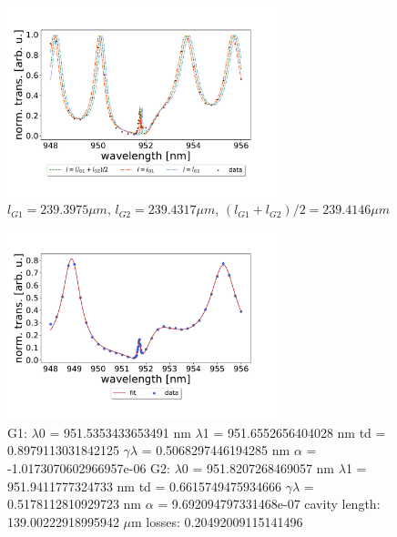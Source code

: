 \begin{figure}[h!]
    \centering
    \includegraphics[width=0.7\textwidth]{figures/results/238um_long_scan_sim_comparison.pdf}
    \caption{$l_{G1} = 239.3975 \mu m$, $l_{G2} = 239.4317 \mu m$, $(l_{G1} + l_{G2})/2 = 239.4146 \mu m$}
    \label{fig:238um_long_scan_sim_comparison}
\end{figure}

\begin{figure}[h!]
    \centering
    \includegraphics[width=0.7\textwidth]{figures/results/129um_long_scan_fit.pdf}
    \caption{G1: 
    $\lambda$0 =  951.5353433653491 nm 
    $\lambda$1 =  951.6552656404028 nm 
    td =  0.8979113031842125 
    $\gamma \lambda$ =  0.5068297446194285 nm 
    $\alpha$ =  -1.0173070602966957e-06
    G2: 
    $\lambda$0 =  951.8207268469057 nm 
    $\lambda$1 =  951.9411777324733 nm 
    td =  0.6615749475934666 
    $\gamma \lambda$ =  0.5178112810929723 nm 
    $\alpha$ =  9.692094797331468e-07
    cavity length:  139.00222918995942 $\mu$m
    losses:  0.20492009115141496
    }
    \label{fig:129um_long_scan_fit}
\end{figure}

